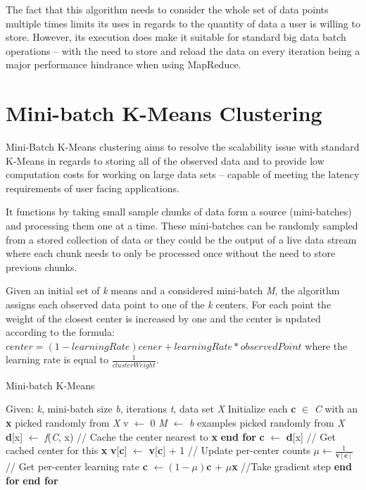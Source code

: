 \documentclass{l4proj}
\begin{document}
The fact that this algorithm needs to consider the whole set of data points multiple times limits its uses in regards to the quantity of data a user is willing to store. However, its execution does make it suitable for standard big data batch operations -- with the need to store and reload the data on every iteration being a major performance hindrance when using MapReduce.

\section{Mini-batch K-Means Clustering}

Mini-Batch K-Means clustering\cite{Mini} aims to resolve the scalability issue with standard K-Means in regards to storing all of the observed data and to provide low computation costs for working on large data sets -- capable of meeting the latency requirements of user facing applications.

It functions by taking small sample chunks of data form a source (mini-batches) and processing them one at a time. These mini-batches can be randomly sampled from a stored collection of data or they could be the output of a live data stream where each chunk needs to only be processed once without the need to store previous chunks.

Given an initial set of \textit{k} means and a considered mini-batch \textit{M}, the algorithm assigns each observed data point to one of the \textit{k} centers. For each point the weight of the closest center is increased by one and the center is updated according to the formula: $center = (1 - learningRate)cener + learningRate * observedPoint$ where the learning rate is equal to $\frac{1}{clusterWeight}$.

\begin{algorithm}
\caption{Mini-batch K-Means}\label{mini-batch}
\begin{algorithmic}[1]
\State Given: \textit{k}, mini-batch size \textit{b}, iterations \textit{t}, data set \textit{X}
\State Initialize each \textbf{c} $\in$ \textit{C} with an \textbf{x} picked randomly from \textit{X}
\State v $\gets$ 0
    \State \textit{M} $\gets$ \textit{b} examples picked randomly from \textit{X} 
    	\State \textbf{d}[x] $\gets$ \textit{f}(\textit{C}, x) \hspace{1cm} // Cache the center nearest to \textbf{x}
    \EndFor
    \State \textbf{end for}
    	\State \textbf{c} $\gets$ \textbf{d}[x] \hspace{1.5cm} // Get cached center for this \textbf{x}
        \State \textbf{v}[\textbf{c}] $\gets$ \textbf{v}[\textbf{c}] + 1 \hspace{0.5cm} // Update per-center counts
        \State $\mu \gets \frac{1}{\textbf{v}[\textbf{c}]}$ \hspace{1.5cm} // Get per-center learning rate
        \State \textbf{c} $\gets (1 - \mu)$\textbf{c} + $\mu$\textbf{x} \hspace{1cm} //Take gradient step
   \EndFor
   \State \textbf{end for}
\EndFor
\State \textbf{end for}
\end{algorithmic}
\end{algorithm}
\end{document}
